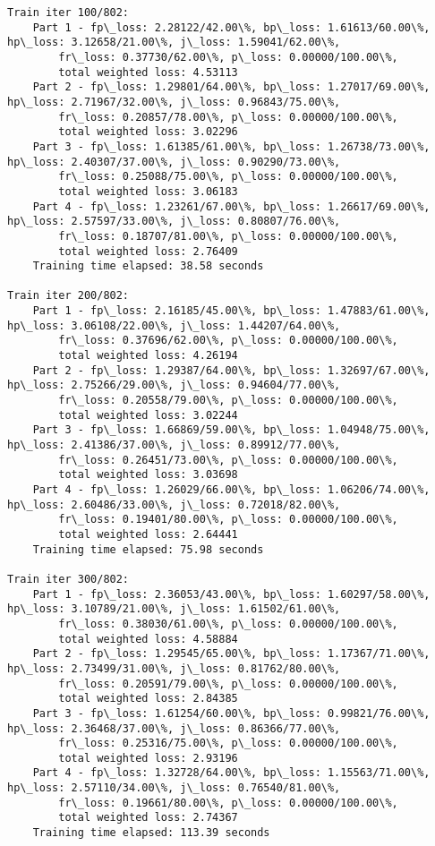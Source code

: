 \documentclass[11pt]{article}
\begin{document}
\begin{Verbatim}[commandchars=\\\{\}]
Train iter 100/802:
	Part 1 - fp\_loss: 2.28122/42.00\%, bp\_loss: 1.61613/60.00\%, hp\_loss: 3.12658/21.00\%, j\_loss: 1.59041/62.00\%, 
		fr\_loss: 0.37730/62.00\%, p\_loss: 0.00000/100.00\%, 
		total weighted loss: 4.53113
	Part 2 - fp\_loss: 1.29801/64.00\%, bp\_loss: 1.27017/69.00\%, hp\_loss: 2.71967/32.00\%, j\_loss: 0.96843/75.00\%, 
		fr\_loss: 0.20857/78.00\%, p\_loss: 0.00000/100.00\%, 
		total weighted loss: 3.02296
	Part 3 - fp\_loss: 1.61385/61.00\%, bp\_loss: 1.26738/73.00\%, hp\_loss: 2.40307/37.00\%, j\_loss: 0.90290/73.00\%, 
		fr\_loss: 0.25088/75.00\%, p\_loss: 0.00000/100.00\%, 
		total weighted loss: 3.06183
	Part 4 - fp\_loss: 1.23261/67.00\%, bp\_loss: 1.26617/69.00\%, hp\_loss: 2.57597/33.00\%, j\_loss: 0.80807/76.00\%, 
		fr\_loss: 0.18707/81.00\%, p\_loss: 0.00000/100.00\%, 
		total weighted loss: 2.76409
	Training time elapsed: 38.58 seconds

Train iter 200/802:
	Part 1 - fp\_loss: 2.16185/45.00\%, bp\_loss: 1.47883/61.00\%, hp\_loss: 3.06108/22.00\%, j\_loss: 1.44207/64.00\%, 
		fr\_loss: 0.37696/62.00\%, p\_loss: 0.00000/100.00\%, 
		total weighted loss: 4.26194
	Part 2 - fp\_loss: 1.29387/64.00\%, bp\_loss: 1.32697/67.00\%, hp\_loss: 2.75266/29.00\%, j\_loss: 0.94604/77.00\%, 
		fr\_loss: 0.20558/79.00\%, p\_loss: 0.00000/100.00\%, 
		total weighted loss: 3.02244
	Part 3 - fp\_loss: 1.66869/59.00\%, bp\_loss: 1.04948/75.00\%, hp\_loss: 2.41386/37.00\%, j\_loss: 0.89912/77.00\%, 
		fr\_loss: 0.26451/73.00\%, p\_loss: 0.00000/100.00\%, 
		total weighted loss: 3.03698
	Part 4 - fp\_loss: 1.26029/66.00\%, bp\_loss: 1.06206/74.00\%, hp\_loss: 2.60486/33.00\%, j\_loss: 0.72018/82.00\%, 
		fr\_loss: 0.19401/80.00\%, p\_loss: 0.00000/100.00\%, 
		total weighted loss: 2.64441
	Training time elapsed: 75.98 seconds

Train iter 300/802:
	Part 1 - fp\_loss: 2.36053/43.00\%, bp\_loss: 1.60297/58.00\%, hp\_loss: 3.10789/21.00\%, j\_loss: 1.61502/61.00\%, 
		fr\_loss: 0.38030/61.00\%, p\_loss: 0.00000/100.00\%, 
		total weighted loss: 4.58884
	Part 2 - fp\_loss: 1.29545/65.00\%, bp\_loss: 1.17367/71.00\%, hp\_loss: 2.73499/31.00\%, j\_loss: 0.81762/80.00\%, 
		fr\_loss: 0.20591/79.00\%, p\_loss: 0.00000/100.00\%, 
		total weighted loss: 2.84385
	Part 3 - fp\_loss: 1.61254/60.00\%, bp\_loss: 0.99821/76.00\%, hp\_loss: 2.36468/37.00\%, j\_loss: 0.86366/77.00\%, 
		fr\_loss: 0.25316/75.00\%, p\_loss: 0.00000/100.00\%, 
		total weighted loss: 2.93196
	Part 4 - fp\_loss: 1.32728/64.00\%, bp\_loss: 1.15563/71.00\%, hp\_loss: 2.57110/34.00\%, j\_loss: 0.76540/81.00\%, 
		fr\_loss: 0.19661/80.00\%, p\_loss: 0.00000/100.00\%, 
		total weighted loss: 2.74367
	Training time elapsed: 113.39 seconds


\end{Verbatim}
\end{document}
